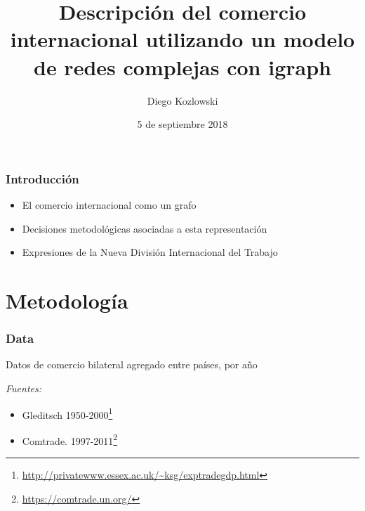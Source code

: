 \documentclass[professionalfont,fleqn]{beamer}
\title[Grafo de Comercio internacional]{Descripción del comercio internacional utilizando un modelo de redes complejas con igraph} %
\author{Diego Kozlowski} %
\institute[Universidad de Buenos Aires] %
		{
		Universidad de Buenos Aires\\ %
		\medskip
		mail: \textit{diegokoz92@gmail.com} %
		\\
		twitter: \textit{@Diego\_Koz}
		}
\date{5 de septiembre 2018} %
\begin{document}
		
		\begin{frame}
		\titlepage %
		\end{frame}
		
		
		\begin{frame}
		\frametitle{Introducción}
		\begin{itemize}
			\item El comercio internacional como un grafo
			\item Decisiones metodológicas asociadas a esta representación
			\item Expresiones de la Nueva División Internacional del Trabajo
		\end{itemize}
		
		\end{frame}
		
		
		
		\section{Metodología} %
	
	
		
		\begin{frame}
		\frametitle{Data}
		
		Datos de comercio bilateral agregado entre países, por año		
		\vspace*{10pt}
		
		\textit{Fuentes:}  
		\begin{itemize}
			\item {Gleditsch 1950-2000}\footnote{\url{http://privatewww.essex.ac.uk/~ksg/exptradegdp.html}}
			\item {Comtrade. 1997-2011}\footnote{\url{https://comtrade.un.org/}}
		\end{itemize}
		
		\end{frame}
		
\end{document}
